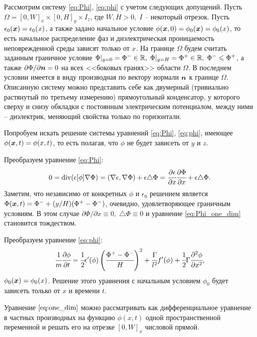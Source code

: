 Рассмотрим систему \eqref{eq:Phi}, \eqref{eq:phi} с учетом следующих допущений. Пусть $\Omega = [0, W]_x \times [0, H]_y \times I_z$, где $W, H > 0, \; I$ -- некоторый отрезок. Пусть $\epsilon_0({\boldsymbol{x}}) = \epsilon_0(x)$, а также задано начальное условие $\phi({\boldsymbol{x}}, 0) = \phi_0({\boldsymbol{x}}) = \phi_0(x)$, то есть начальное распределение фаз и диэлектрическая проницаемость неповрежденной среды зависят только от $x$. На границе $\Omega$ будем считать заданным граничное условие $\Phi|_{y = 0} = \Phi^- \in {\mathbb{R}}, \; \Phi|_{y = H} = \Phi^+ \in {\mathbb{R}}, \; \Phi^- \leqslant \Phi^+$, а также $\partial \Phi / \partial {\boldsymbol{n}} = 0$ на всех <<боковых гранях>> области $\Omega$. В последнем условии имеется в виду производная по вектору нормали ${\boldsymbol{n}}$ к границе $\Omega$. Описанную систему можно представить себе как двумерный (тривиально растянутый по третьему измерению) прямоугольный конденсатор, у которого сверху и снизу обкладки с постоянным электрическим потенциалом, между ними -- диэлектрик, меняющий свойства только по горизонтали.

Попробуем искать решение системы уравнений \eqref{eq:Phi}, \eqref{eq:phi}, имеющее $\phi({\boldsymbol{x}}, t) = \phi(x, t)$, то есть полагая, что $\phi$ не будет зависеть от $y$ и $z$.

Преобразуем уравнение \eqref{eq:Phi}:
\begin{equation}
	0 = \operatorname{{div}}(\epsilon[\phi] \nabla \Phi) = (\nabla \epsilon, \nabla \Phi) + \epsilon \triangle \Phi = \cfrac{\partial \epsilon}{\partial x} \cfrac{\partial \Phi}{\partial x} + \epsilon \triangle \Phi {\text{.}}
	\label{eq:Phi_one_dim}
\end{equation}
Заметим, что независимо от конкретных $\phi$ и $\epsilon_0$ решением является $\Phi({\boldsymbol{x}}, t) = \Phi^- + (y / H)(\Phi^+ - \Phi^-)$, очевидно, удовлетворяющее граничным условиям. В этом случае $\partial \Phi / \partial x \equiv 0, \; \triangle \Phi \equiv 0$ и уравнение \eqref{eq:Phi_one_dim} становится тождеством.

Преобразуем уравнение \eqref{eq:phi}:
\begin{equation}
	\cfrac{1}{m} \cfrac{\partial \phi}{\partial t} = \cfrac{1}{2} \epsilon'(\phi) \left( \cfrac{\Phi^+ - \Phi^-}{H} \right)^2 + \cfrac{\Gamma}{l^2} f'(\phi) + \cfrac{1}{2} \Gamma \cfrac{\partial^2 \phi}{\partial x^2} {\text{,}}
	\label{eq:one_dim}
\end{equation}
$\phi_0({\boldsymbol{x}}) = \phi_0(x)$. Решение этого уравнения с начальным условием $\phi_0$ будет зависеть только от $x$ и времени $t$.

Уравнение $\eqref{eq:one_dim}$ можно рассматривать как дифференциальное уравнение в частных производных на функцию $\phi(x, t)$ одной пространственной переменной и решать его на отрезке $[0, W]_x$ числовой прямой.


